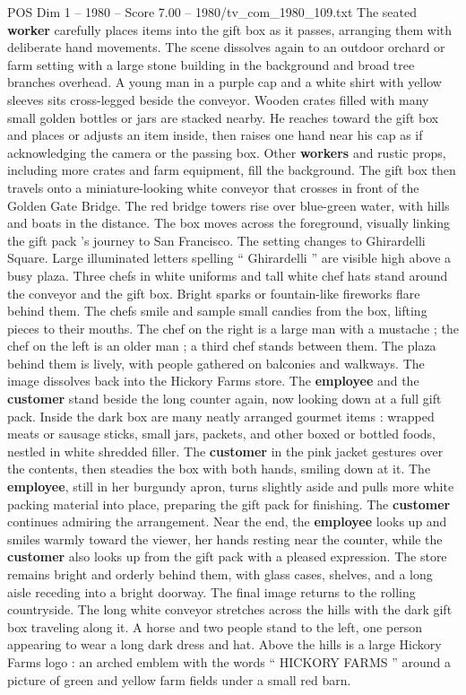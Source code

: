 \begin{textsample}{POS Dim 1 – 1980 – Score 7.00 – 1980/tv\_com\_1980\_109.txt}
The seated \textbf{worker} carefully places items into the gift box as it passes, arranging them with deliberate hand movements.
The scene dissolves again to an outdoor orchard or farm setting with a large stone building in the background and broad tree branches overhead.
A young man in a purple cap and a white shirt with yellow sleeves sits cross-legged beside the conveyor.
Wooden crates filled with many small golden bottles or jars are stacked nearby.
He reaches toward the gift box and places or adjusts an item inside, then raises one hand near his cap as if acknowledging the camera or the passing box.
Other \textbf{workers} and rustic props, including more crates and farm equipment, fill the background.
The gift box then travels onto a miniature-looking white conveyor that crosses in front of the Golden Gate Bridge.
The red bridge towers rise over blue-green water, with hills and boats in the distance.
The box moves across the foreground, visually linking the gift pack ’s journey to San Francisco.
The setting changes to Ghirardelli Square.
Large illuminated letters spelling “ Ghirardelli ” are visible high above a busy plaza.
Three chefs in white uniforms and tall white chef hats stand around the conveyor and the gift box.
Bright sparks or fountain-like fireworks flare behind them.
The chefs smile and sample small candies from the box, lifting pieces to their mouths.
The chef on the right is a large man with a mustache ; the chef on the left is an older man ; a third chef stands between them.
The plaza behind them is lively, with people gathered on balconies and walkways.
The image dissolves back into the Hickory Farms store.
The \textbf{employee} and the \textbf{customer} stand beside the long counter again, now looking down at a full gift pack.
Inside the dark box are many neatly arranged gourmet items : wrapped meats or sausage sticks, small jars, packets, and other boxed or bottled foods, nestled in white shredded filler.
The \textbf{customer} in the pink jacket gestures over the contents, then steadies the box with both hands, smiling down at it.
The \textbf{employee}, still in her burgundy apron, turns slightly aside and pulls more white packing material into place, preparing the gift pack for finishing.
The \textbf{customer} continues admiring the arrangement.
Near the end, the \textbf{employee} looks up and smiles warmly toward the viewer, her hands resting near the counter, while the \textbf{customer} also looks up from the gift pack with a pleased expression.
The store remains bright and orderly behind them, with glass cases, shelves, and a long aisle receding into a bright doorway.
The final image returns to the rolling countryside.
The long white conveyor stretches across the hills with the dark gift box traveling along it.
A horse and two people stand to the left, one person appearing to wear a long dark dress and hat.
Above the hills is a large Hickory Farms logo : an arched emblem with the words “ HICKORY FARMS ” around a picture of green and yellow farm fields under a small red barn.

\end{textsample}

